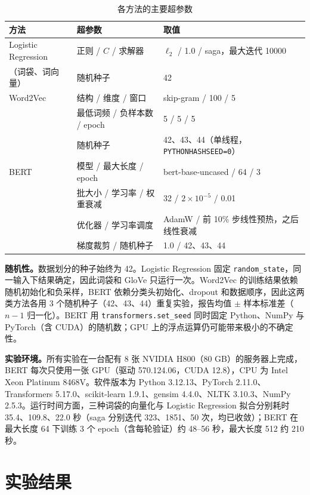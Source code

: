 \documentclass[lang=cn,a4paper]{elegantpaper}
\begin{document}
\begin{table}[htbp]
  \centering
  \caption{各方法的主要超参数}
  \label{tab:hp}
  \begin{tabular}{lll}
    \toprule
    方法 & 超参数 & 取值 \\
    \midrule
    Logistic Regression & 正则 / $C$ / 求解器 & $\ell_2$ / 1.0 / saga，最大迭代 10000 \\
    （词袋、词向量） & 随机种子 & 42 \\
    \midrule
    Word2Vec & 结构 / 维度 / 窗口 & skip-gram / 100 / 5 \\
     & 最低词频 / 负样本数 / epoch & 5 / 5 / 5 \\
     & 随机种子 & 42、43、44（单线程，\texttt{PYTHONHASHSEED=0}） \\
    \midrule
    BERT & 模型 / 最大长度 / epoch & bert-base-uncased / 64 / 3 \\
     & 批大小 / 学习率 / 权重衰减 & 32 / $2\times10^{-5}$ / 0.01 \\
     & 优化器 / 学习率调度 & AdamW / 前 10\% 步线性预热，之后线性衰减 \\
     & 梯度裁剪 / 随机种子 & 1.0 / 42、43、44 \\
    \bottomrule
  \end{tabular}
\end{table}

\textbf{随机性。}数据划分的种子始终为 42。Logistic Regression 固定 \texttt{random\_state}，同一输入下结果确定，因此词袋和 GloVe 只运行一次。Word2Vec 的训练结果依赖随机初始化和负采样，BERT 依赖分类头初始化、dropout 和数据顺序，因此这两类方法各用 3 个随机种子（42、43、44）重复实验，报告均值 $\pm$ 样本标准差（$n-1$ 归一化）。BERT 用 \texttt{transformers.set\_seed} 同时固定 Python、NumPy 与 PyTorch（含 CUDA）的随机数；GPU 上的浮点运算仍可能带来极小的不确定性。

\textbf{实验环境。}所有实验在一台配有 8 张 NVIDIA H800（80 GB）的服务器上完成，BERT 每次只使用一张 GPU（驱动 570.124.06，CUDA 12.8），CPU 为 Intel Xeon Platinum 8468V。软件版本为 Python 3.12.13、PyTorch 2.11.0、Transformers 5.17.0、scikit-learn 1.9.1、gensim 4.4.0、NLTK 3.10.3、NumPy 2.5.3。运行时间方面，三种词袋的向量化与 Logistic Regression 拟合分别耗时 35.4、109.8、22.0 秒（saga 分别迭代 323、1851、50 次，均已收敛）；BERT 在最大长度 64 下训练 3 个 epoch（含每轮验证）约 48--56 秒，最大长度 512 约 210 秒。

\section{实验结果}
\end{document}
